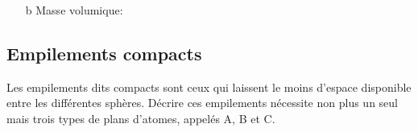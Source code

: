 \documentclass[../../main/main.tex]{subfiles}
\begin{document}
\begin{tcb*}[breakable]
\begin{itemize}
		\item[b]{Masse volumique}:
		\leavevmode\vspace*{-25pt}\relax
	\end{itemize}
\end{tcb*}

\subsection{Empilements compacts}
Les empilements dits compacts sont ceux qui laissent le moins d'espace
disponible entre les différentes sphères. Décrire ces empilements nécessite non
plus un seul mais trois types de plans d'atomes, appelés A, B et C.
\end{document}
